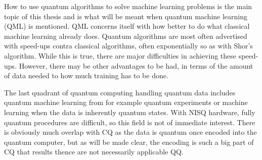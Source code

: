 How to use quantum algorithms to solve machine learning problems is the main topic of this thesis and is what will be meant when quantum machine learning (QML) is mentioned.
QML concerns itself with how better to do what classical machine learning already does.
Quantum algorithms are most often advertised with speed-ups contra classical algorithms, often exponentially so as with Shor's algorithm.
While this is true, there are major difficulties in achieving these speed-ups.
However, there may be other advantages to be had, in terms of the amount of data needed to how much training has to be done.

The last quadrant of quantum computing handling quantum data includes quantum machine learning from for example quantum experiments or machine learning when the data is inherently quantum states.
With NISQ hardware, fully quantum procedures are difficult, so this field is not of immediate interest.
There is obviously much overlap with CQ as the data is quantum once encoded into the quantum computer, but as will be made clear, the encoding is such a big part of CQ that results thence are not necessarily applicable QQ.






